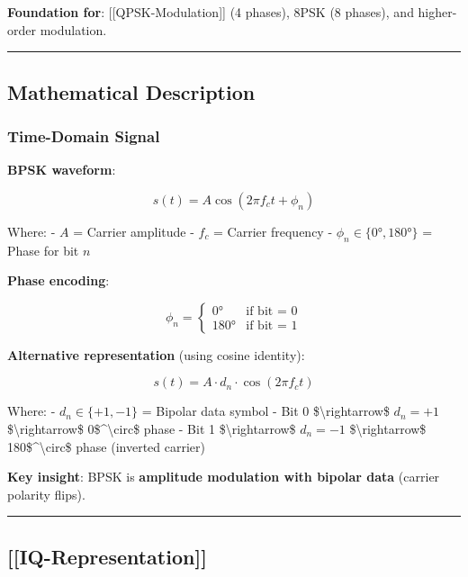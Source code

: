 \textbf{Foundation for}: {[}{[}QPSK-Modulation{]}{]} (4 phases), 8PSK (8
phases), and higher-order modulation.

\begin{center}\rule{0.5\linewidth}{0.5pt}\end{center}

\subsection{Mathematical Description}\label{mathematical-description}

\subsubsection{Time-Domain Signal}\label{time-domain-signal}

\textbf{BPSK waveform}:

\[
s(t) = A \cos(2\pi f_c t + \phi_n)
\]

Where: - \(A\) = Carrier amplitude - \(f_c\) = Carrier frequency -
\(\phi_n \in \{0°, 180°\}\) = Phase for bit \(n\)

\textbf{Phase encoding}:

\[
\phi_n = \begin{cases}
0° & \text{if bit = 0} \\
180° & \text{if bit = 1}
\end{cases}
\]

\textbf{Alternative representation} (using cosine identity):

\[
s(t) = A \cdot d_n \cdot \cos(2\pi f_c t)
\]

Where: - \(d_n \in \{+1, -1\}\) = Bipolar data symbol - Bit 0
\$\textbackslash rightarrow\$ \(d_n = +1\) \$\textbackslash rightarrow\$
0\$\^{}\textbackslash circ\$ phase - Bit 1 \$\textbackslash rightarrow\$
\(d_n = -1\) \$\textbackslash rightarrow\$
180\$\^{}\textbackslash circ\$ phase (inverted carrier)

\textbf{Key insight}: BPSK is \textbf{amplitude modulation with bipolar
data} (carrier polarity flips).

\begin{center}\rule{0.5\linewidth}{0.5pt}\end{center}

\subsection{{[}{[}IQ-Representation{]}{]}}\label{iq-representation}

